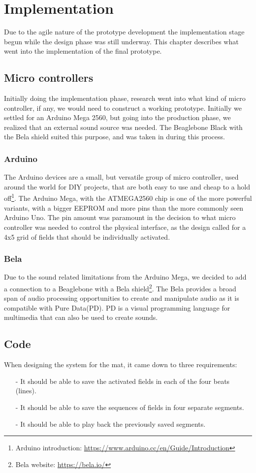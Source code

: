 \chapter{Implementation}%
Due to the agile nature of the prototype development the implementation stage begun while the design phase was still underway. This chapter describes what went into the implementation of the final prototype.

\section{Micro controllers}%
	Initially doing the implementation phase, research went into what kind of micro controller, if any, we would need to construct a working prototype. Initially we settled for an Arduino Mega 2560, but going into the production phase, we realized that an external sound source was needed. The Beaglebone Black with the Bela shield suited this purpose, and was taken in during this process.
	\subsection{Arduino}%
		The Arduino devices are a small, but versatile group of micro controller, used around the world for DIY projects, that are both easy to use and cheap to a hold off\footnote{Arduino introduction: \url{https://www.arduino.cc/en/Guide/Introduction}}. The Arduino Mega, with the ATMEGA2560 chip is one of the more powerful variants, with a bigger EEPROM and more pins than the more commonly seen Arduino Uno. The pin amount was paramount in the decision to what micro controller was needed to control the physical interface, as the design called for a 4x5 grid of fields that should be individually activated. 
		
	\subsection{Bela}%
		Due to the sound related limitations from the Arduino Mega, we decided to add a connection to a Beaglebone with a Bela shield\footnote{Bela website: \url{https://bela.io/}}. The Bela provides a broad span of audio processing opportunities to create and manipulate audio as it is compatible with Pure Data(PD). PD is a visual programming language for multimedia that can also be used to create sounds.
	
\section{Code}
	When designing the system for the mat, it came down to three requirements:
	\begin{itemize}
		\item[-] It should be able to save the activated fields in each of the four beats (lines).
		\item[-] It should be able to save the sequences of fields in four separate segments.
		\item[-] It should be able to play back the previously saved segments.
	\end{itemize}
